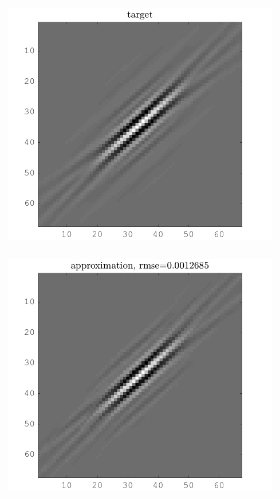 \begin{figure}[!ht]\centering
\begin{subfigure}[b]{0.4\textwidth}\centering
	\begin{subfigure}[b]{1\textwidth}\centering
	\includegraphics[width=\textwidth]{figures/variable_support/xp_128x128_sc2_angl1_K3_S3_node4_variable_support_target.png}
	\end{subfigure}
	\begin{subfigure}[b]{1\textwidth}\centering
	\includegraphics[width=\textwidth]{figures/variable_support/xp_128x128_sc2_angl1_K3_S3_node4_variable_support_approx.png}

\end{subfigure}
\end{subfigure}
\end{figure}
